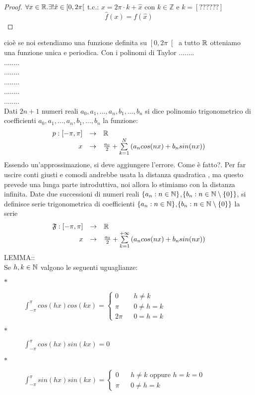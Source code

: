 \begin{proof}
	$\forall x\in \mathbb{R}. \exists ! \hat{x}\in\left[0,2\pi\right[$ t.c.: $x=2\pi\cdot k+\hat{x}$ con $k\in\mathbb{Z}$ e $k=\left[??????\right]$
	\[\hat{f}(x)=f(\hat{x})\]
\end{proof}
cioè se noi estendiamo una funzione definita su $\left[0,2\pi\right[$ a tutto $ \mathbb{R}$ otteniamo una funzione unica e periodica.
\observation
Con i polinomi di Taylor ........\\
........\\
........\\
........\\
........\\
........\\
Dati $2n+1$ numeri reali $a_0,a_1,\dotsc,a_n,b_1,\dotsc,b_n$ si dice polinomio trigonometrico di coefficienti $a_0,a_1,\dotsc,a_n,b_1,\dotsc,b_n$ la funzione:
\[\begin{array}{rcl} p: \left[-\pi,\pi\right] & \to &  \mathbb{R} \\ x & \to & \frac{a_0}{2}+\sum\limits_{k=1}^{N}\left(a_n cos(nx)+b_n sin(nx)\right) \end{array}\]
\observation
Essendo un'approssimazione, si deve aggiungere l'errore. Come è fatto?. Per far uscire conti giusti e comodi andrebbe usata la distanza quadratica , ma questo prevede una lunga parte introduttiva, noi allora lo stimiamo con la distanza infinita.
Date due successioni di numeri reali $\left\{a_n:n\in\mathbb{N}\right\}$,$\left\{b_n:n\in\mathbb{N}\setminus\left\{0\right\}\right\}$, si definisce serie trigonometrica di coefficienti  $\left\{a_n:n\in\mathbb{N}\right\}$,$\left\{b_n:n\in\mathbb{N}\setminus\left\{0\right\}\right\}$ la serie
\[\begin{array}{rcl} \mathfrak{F}: \left[-\pi,\pi\right] & \to &  \mathbb{R} \\ x & \to & \frac{a_0}{2}+\sum\limits_{k=1}^{+\infty}\left(a_n cos(nx)+b_n sin(nx)\right) \end{array}\]
LEMMA::\\
Se $h,k\in\mathbb{N}$ valgono le seguenti uguaglianze:
\begin{description}
	\item[$\ast$]
	$\int_{-\pi}^{\pi} cos(hx)cos(kx)=
	\left\{\begin{matrix}
	0 &&h\ne k\\\pi&&0\ne h=k\\2\pi&&0=h=k
	\end{matrix}\right.$
	\item[$\ast$] $\int_{-\pi}^{\pi}cos(hx)sin(kx)= 0 $
	\item[$\ast$]
	$\int_{-\pi}^{\pi}sin(hx)sin(kx)=
	\left\{\begin{matrix}
	0 &&h\ne k\text{ oppure }h=k=0\\ \pi&&0\ne h=k
	\end{matrix}\right.$
\end{description}
